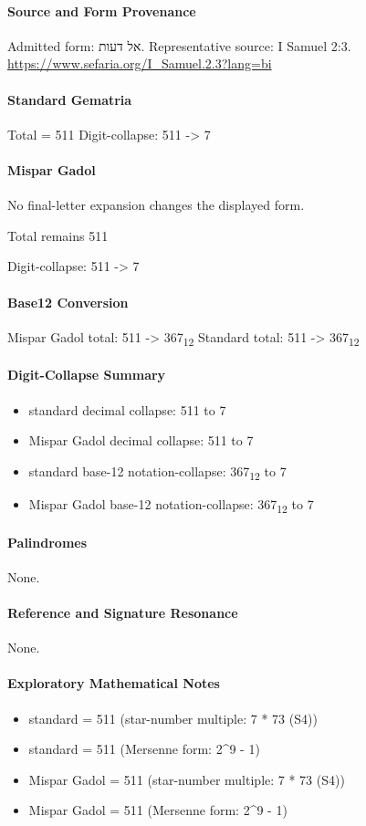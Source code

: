 \paragraph{Source and Form Provenance}
Admitted form: אל דעות.
Representative source: I Samuel 2:3.
\url{https://www.sefaria.org/I_Samuel.2.3?lang=bi}
\paragraph{Standard Gematria}
Total = 511
Digit-collapse: 511 -> 7
\paragraph{Mispar Gadol}
No final-letter expansion changes the displayed form.

Total remains 511

Digit-collapse: 511 -> 7
\paragraph{Base12 Conversion}
Mispar Gadol total: 511 -> 367\textsubscript{12}
Standard total: 511 -> 367\textsubscript{12}
\paragraph{Digit-Collapse Summary}
\begin{itemize}
\item standard decimal collapse: 511 to 7
\item Mispar Gadol decimal collapse: 511 to 7
\item standard base-12 notation-collapse: 367\textsubscript{12} to 7
\item Mispar Gadol base-12 notation-collapse: 367\textsubscript{12} to 7
\end{itemize}
\paragraph{Palindromes}
None.
\paragraph{Reference and Signature Resonance}
None.
\paragraph{Exploratory Mathematical Notes}
\begin{itemize}
\item standard = 511 (star-number multiple: 7 * 73 (S4))
\item standard = 511 (Mersenne form: 2\textasciicircum{}9 - 1)
\item Mispar Gadol = 511 (star-number multiple: 7 * 73 (S4))
\item Mispar Gadol = 511 (Mersenne form: 2\textasciicircum{}9 - 1)
\end{itemize}
